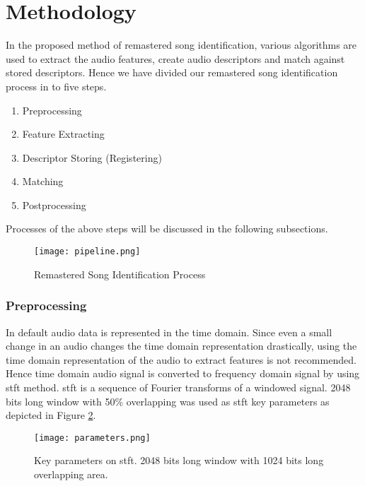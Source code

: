 \section{Methodology}

In the proposed method of remastered song identification, various algorithms are used to
extract the audio features, create audio descriptors and match against stored descriptors.
Hence we have divided our remastered song identification process in to five steps.

\begin{enumerate}
    \item Preprocessing
    \item Feature Extracting
    \item Descriptor Storing (Registering)
    \item Matching
    \item Postprocessing
  \end{enumerate}

Processes of the above steps will be discussed in the following subsections.

\begin{figure}[h]
    \centering
    \texttt{[image: pipeline.png]}
    \caption{Remastered Song Identification Process}
    \label{fig:pipeline}
\end{figure}


\subsubsection{Preprocessing}

In default audio data is represented in the time domain. Since even a small change in an audio changes the time domain representation drastically,
using the time domain representation of the audio to extract features is not recommended. Hence time domain audio signal is converted to
frequency domain signal by using \gls{stft} method. \gls{stft} is a sequence of Fourier transforms of a windowed signal\cite{Kehtarnavaz2008}.
2048 bits long window with 50\% overlapping was used as \gls{stft} key parameters as depicted in Figure \ref{fig:parameters}.

\begin{figure}[h]
  \centering
  \texttt{[image: parameters.png]}
  \caption{Key parameters on \gls{stft}. 2048 bits long window with 1024 bits long overlapping area.}
  \label{fig:parameters}
\end{figure}

